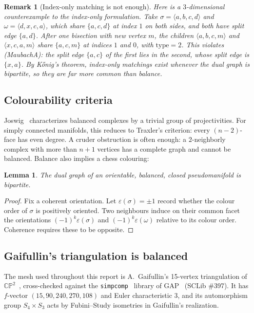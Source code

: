 \documentclass[11pt]{article}
\newtheorem*{lemthm}{Lemma}
\newtheorem*{remthm}{Remark}
\newcommand{\CP}{\mathbb{CP}}
\newcommand{\type}{\mathrm{type}}
\begin{document}
\begin{remthm}[Index-only matching is not enough]
Here is a $3$-dimensional counterexample to the index-only formulation.
Take $\sigma=\langle a,b,c,d\rangle$ and
$\omega=\langle d,x,c,a\rangle$, which share $\{a,c,d\}$ at index $1$ on
both sides, and both have split edge $\{a,d\}$. After one bisection with
new vertex $m$, the children $\langle a,b,c,m\rangle$ and
$\langle x,c,a,m\rangle$ share $\{a,c,m\}$ at indices $1$ and $0$, with
$\type=2$. This violates (MaubachA): the split edge $\{a,c\}$ of the
first lies in the second, whose split edge is $\{x,a\}$. By Kőnig's
theorem, index-only matchings exist whenever the dual graph is
bipartite, so they are far more common than balance.
\end{remthm}

\subsection{Colourability criteria}

Joswig~\cite{joswig2002} characterizes balanced complexes by a trivial
group of projectivities. For simply connected manifolds, this reduces to
Traxler's criterion: every $(n{-}2)$-face has even degree. A cruder
obstruction is often enough: a $2$-neighborly complex with more than
$n+1$ vertices has a complete graph and cannot be balanced. Balance also
implies a chess colouring:

\begin{lemthm}
The dual graph of an orientable, balanced, closed pseudomanifold is
bipartite.
\end{lemthm}

\begin{proof}
Fix a coherent orientation. Let $\varepsilon(\sigma)=\pm1$ record whether
the colour order of $\sigma$ is positively oriented. Two neighbours induce
on their common facet the orientations $(-1)^k\varepsilon(\sigma)$ and
$(-1)^k\varepsilon(\omega)$ relative to its colour order. Coherence
requires these to be opposite.
\end{proof}

\subsection{Gaifullin's triangulation is balanced}

The mesh used throughout this report is A.~Gaifullin's 15-vertex
triangulation of $\CP^2$~\cite{gaifullin}, cross-checked against the
\texttt{simpcomp}~\cite{simpcomp} library of GAP~\cite{gap} (SCLib
\#397). It has $f$-vector $(15,90,240,270,108)$ and Euler
characteristic $3$, and its automorphism group $S_4\times S_3$ acts by
Fubini--Study isometries in Gaifullin's realization.
\end{document}
